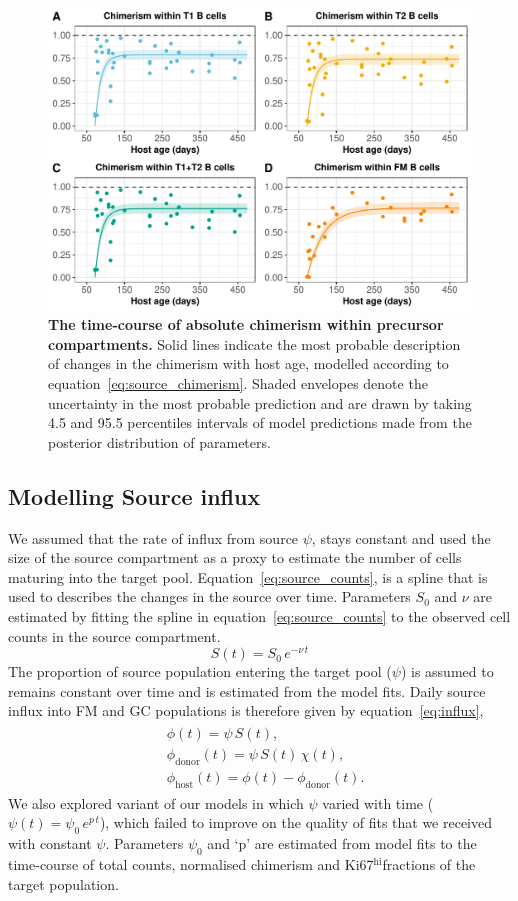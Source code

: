 \documentclass[11pt]{article}
\newcommand{\be}{\begin{equation}}
\newcommand{\ee}{\end{equation}}
\newcommand{\bea}{\begin{eqnarray}}
\newcommand{\eea}{\end{eqnarray}}
\newcommand{\khi}{Ki67$^\text{hi}$}
\begin{document}
\begin{figure}[htbp]
	\centerline{\includegraphics[scale = 0.85] {SI_source_chimerism.pdf}}
	\caption{ \textbf{The time-course of absolute chimerism within precursor compartments.} Solid lines indicate the most probable description of changes in the chimerism with host age, modelled according to equation~\ref{eq:source_chimerism}. Shaded envelopes denote the uncertainty in the most probable prediction and are drawn by taking 4.5 and 95.5 percentiles intervals of model predictions made from the posterior distribution of parameters.}
	\label{fig:source_chi}
\end{figure}

\subsection{Modelling Source influx} \label{source_influx}
We assumed that the rate of influx from source $\psi$, stays constant and used the size of the source compartment as a proxy to estimate the number of cells maturing into the target pool.  
Equation~\ref{eq:source_counts}, is a spline that is used to describes the changes in the source over time. 
Parameters $S_0$ and $\nu$ are estimated by fitting the spline in equation~\ref{eq:source_counts} to the observed cell counts in the source compartment.
\be
S(t) = S_0 \, e^{-\nu \, t}
\label{eq:source_counts}
\ee
The proportion of source population entering the target pool ($\psi$) is assumed to remains constant over time and is estimated from the model fits.
Daily source influx into FM and GC populations is therefore given by equation~\ref{eq:influx},
\bea
\begin{aligned}
	&\phi(t) = \psi \, S(t), \\
	&\phi_{\text{donor}}(t) = \psi \, S(t) \, \chi(t),  \\
	&\phi_{\text{host}}(t) = \phi(t) - \phi_{\text{donor}}(t).
\end{aligned}
\label{eq:influx}
\eea
We also explored variant of our models in which $\psi$ varied with time ($\psi(t)=\psi_0\,e^{p\,t}$), which failed to improve on the quality of fits that we received with constant $\psi$.
Parameters $\psi_0$ and `p' are estimated from model fits to the time-course of total counts, normalised chimerism and \khi fractions of the target population. 
\end{document}
